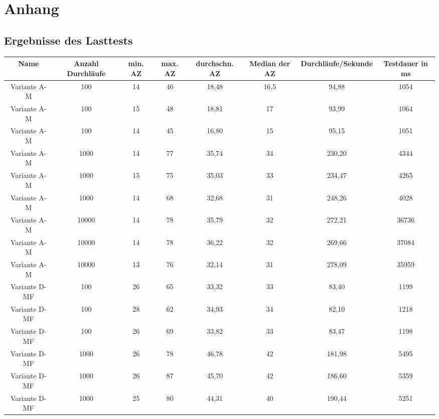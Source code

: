 
\chapter{Anhang}

\section{Ergebnisse des Lasttests}


\begin{landscape}
\begin{table}[h!]
	\centering
	\small
	\begin{tabular}{ |c|c|c|c|c|c|c|c|} 
		\hline
		Name & Anzahl Durchläufe & min. AZ & max. AZ & durchschn. AZ & Median der AZ & Durchläufe/Sekunde & Testdauer in ms \\ 
		\hline
		Variante A-M & 100 & 14 & 46 & 18,48 & 16,5 & 94,88 & 1054 \\ 
		\hline
		Variante A-M & 100 & 15 & 48 & 18,81 & 17 & 93,99 & 1064 \\ 
		\hline
		Variante A-M & 100 & 14 & 45 & 16,80 & 15 & 95,15 & 1051 \\ 
		\hline
		
		Variante A-M & 1000 & 14 & 77 & 35,74 & 34 & 230,20 & 4344 \\ 
		\hline
		Variante A-M & 1000 & 15 & 75 & 35,03 & 33 & 234,47 & 4265 \\ 
		\hline
		Variante A-M & 1000 & 14 & 68 & 32,68 & 31 & 248,26 & 4028 \\ 
		\hline
		
		Variante A-M & 10000 & 14 & 78 & 35,79 & 32 & 272,21 & 36736 \\ 
		\hline
		Variante A-M & 10000 & 14 & 78 & 36,22 & 32 & 269,66 & 37084 \\ 
		\hline
		Variante A-M & 10000 & 13 & 76 & 32,14 & 31 & 278,09 & 35959 \\ 
		\hline
		
		Variante D-MF & 100 & 26 & 65 & 33,32 & 33 & 83,40 & 1199 \\ 
		\hline
		Variante D-MF & 100 & 28 & 62 & 34,93 & 34 & 82,10 & 1218 \\ 
		\hline
		Variante D-MF & 100 & 26 & 69 & 33,82 & 33 & 83,47 & 1198 \\ 
		\hline
		
		Variante D-MF & 1000 & 26 & 78 & 46,78 & 42 & 181,98 & 5495 \\ 
		\hline
		Variante D-MF & 1000 & 26 & 87 & 45,70 & 42 & 186,60 & 5359 \\ 
		\hline
		Variante D-MF & 1000 & 25 & 80 & 44,31 & 40 & 190,44 & 5251 \\ 
		\hline
		

\end{tabular}
\end{table}
\end{landscape}
